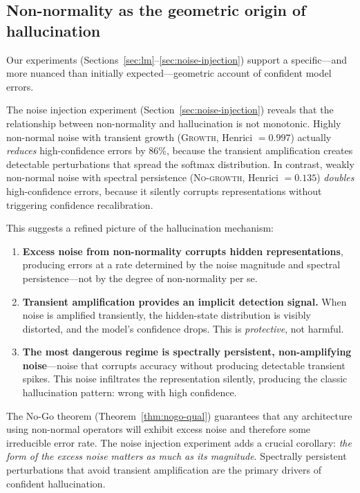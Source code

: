 \documentclass[11pt,a4paper]{article}
\theoremstyle{definition}
\begin{document}
\subsection{Non-normality as the geometric origin of hallucination}

Our experiments (Sections~\ref{sec:lm}--\ref{sec:noise-injection})
support a specific---and more nuanced than initially
expected---geometric account of confident model errors.

The noise injection experiment (Section~\ref{sec:noise-injection})
reveals that the relationship between non-normality and hallucination
is not monotonic. Highly non-normal noise with transient growth
(\textsc{Growth}, Henrici $= 0.997$) actually \emph{reduces}
high-confidence errors by 86\%, because the transient amplification
creates detectable perturbations that spread the softmax distribution.
In contrast, weakly non-normal noise with spectral persistence
(\textsc{No-growth}, Henrici $= 0.135$) \emph{doubles}
high-confidence errors, because it silently corrupts representations
without triggering confidence recalibration.

This suggests a refined picture of the hallucination mechanism:
\begin{enumerate}[nosep]
  \item \textbf{Excess noise from non-normality corrupts hidden
        representations}, producing errors at a rate determined by
        the noise magnitude and spectral persistence---not by the
        degree of non-normality per se.
  \item \textbf{Transient amplification provides an implicit
        detection signal.} When noise is amplified transiently, the
        hidden-state distribution is visibly distorted, and the
        model's confidence drops. This is \emph{protective}, not
        harmful.
  \item \textbf{The most dangerous regime is spectrally persistent,
        non-amplifying noise}---noise that corrupts accuracy without
        producing detectable transient spikes. This noise infiltrates
        the representation silently, producing the classic hallucination
        pattern: wrong with high confidence.
\end{enumerate}

The No-Go theorem (Theorem~\ref{thm:nogo-qual}) guarantees that
any architecture using non-normal operators will exhibit excess noise
and therefore some irreducible error rate. The noise injection
experiment adds a crucial corollary: \emph{the form of the excess
noise matters as much as its magnitude}. Spectrally persistent
perturbations that avoid transient amplification are the primary
drivers of confident hallucination.
\end{document}
